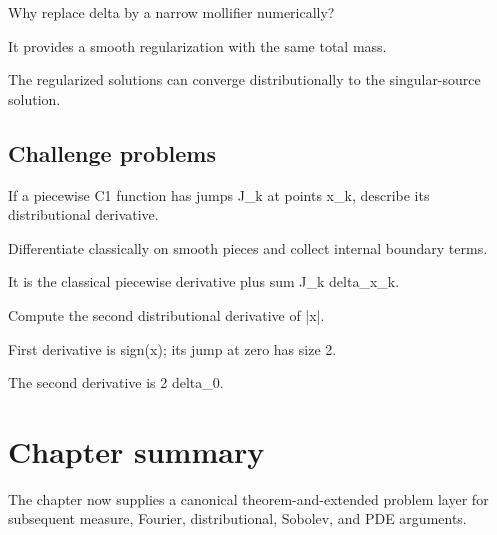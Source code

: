 \begin{exercise}\label{exr:iii16-expand-14}
Why replace delta by a narrow mollifier numerically?
\end{exercise}
\begin{hint}
It provides a smooth regularization with the same total mass.
\end{hint}
\begin{solution}
The regularized solutions can converge distributionally to the singular-source solution.
\end{solution}

\subsection*{Challenge problems}

\begin{exercise}\label{exr:iii16-expand-15}
If a piecewise C1 function has jumps J\_k at points x\_k, describe its distributional derivative.
\end{exercise}
\begin{hint}
Differentiate classically on smooth pieces and collect internal boundary terms.
\end{hint}
\begin{solution}
It is the classical piecewise derivative plus sum J\_k delta\_{x\_k}.
\end{solution}

\begin{exercise}\label{exr:iii16-expand-16}
Compute the second distributional derivative of |x|.
\end{exercise}
\begin{hint}
First derivative is sign(x); its jump at zero has size 2.
\end{hint}
\begin{solution}
The second derivative is 2 delta\_0.
\end{solution}
\section*{Chapter summary}
The chapter now supplies a canonical theorem-and-extended problem layer for subsequent measure, Fourier, distributional, Sobolev, and PDE arguments.
